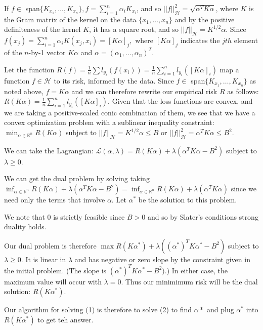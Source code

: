 \documentclass[12pt]{article}
\begin{document}
If $f \in $ span$\{K_{x_1},\ldots, K_{x_n}\}, f = \sum_{i=1}^n \alpha_i K_{x_i}$, and so $||f||_\mathcal{H}^2 = \sqrt{\alpha^T K \alpha}$, where $K$ is the Gram matrix of the kernel on the data $\{x_1, \ldots, x_n \}$ and by the positive definiteness of the kernel $K$, it has a square root, and so $||f||_\mathcal{H} = K^{1/2}\alpha$. Since $f(x_j) = \sum_{i=1}^n \alpha_i K(x_j, x_i) = [K\alpha]_j,$ where $[K \alpha]_j$ indicates the $jth$ element of the $n$-by-1 vector $K\alpha$ and $\alpha = (\alpha_1, \ldots, \alpha_n)^T$.

Let the function $R(f) = \frac{1}{n} \sum l_{y_i}(f(x_i)) = \frac{1}{n} \sum_{i=1}^n l_{y_i}([K\alpha]_i)$ map a function $f\in \mathcal{H}$ to its risk, informed by the data. Since $f \in $ span$\{K_{x_1},\ldots, K_{x_n}\}$ as noted above, $f = K\alpha$ and we can therefore rewrite our empirical risk $R$ as follows: $R(K\alpha)= \frac{1}{n} \sum_{i=1}^n l_{y_i}([K\alpha]_i)$. Given that the loss functions are convex, and we are taking a positive-scaled conic combination of them, we see that we have a convex optimization problem with a sublinear inequality constraint: $\min_{\alpha \in \mathbb{R}^n} R(K\alpha)$ subject to $||f||_\mathcal{H} = K^{1/2}\alpha \leq B$ or $||f||_\mathcal{H}^2 = \alpha^T K \alpha \leq B^2.$

We can take the Lagrangian:
$\mathcal{L}(\alpha, \lambda) = R(K\alpha) + \lambda(\alpha^TK\alpha - B^2)$ subject to $\lambda \geq 0$. 

We can get the dual problem by solving taking $\inf_{\alpha \in \mathbb{R}^n} R(K\alpha) + \lambda(\alpha^T K \alpha - B^2) = \inf_{\alpha \in \mathbb{R}^n} R(K\alpha) + \lambda(\alpha^T K \alpha)$ since we need only the terms that involve $\alpha$. Let $\alpha^*$ be the solution to this problem.

We note that 0 is strictly feasible since $B > 0$ and so by Slater's conditions strong duality holds.

Our dual problem is therefore $\max R(K\alpha^*) + \lambda((\alpha^*)^T K \alpha^* - B^2)$ subject to $\lambda \geq 0$. It is linear in $\lambda$ and has negative or zero slope by the constraint given in the initial problem. (The slope is $(\alpha^*)^T K \alpha^* - B^2)$.) In either case, the maximum value will occur with $\lambda = 0$. Thus our minimimum risk will be the dual solution: $R(K\alpha^*)$.

Our algorithm for solving (1) is therefore to solve (2) to find $\alpha*$ and plug $\alpha^*$ into $R(K\alpha^*)$ to get teh answer.
\end{document}
